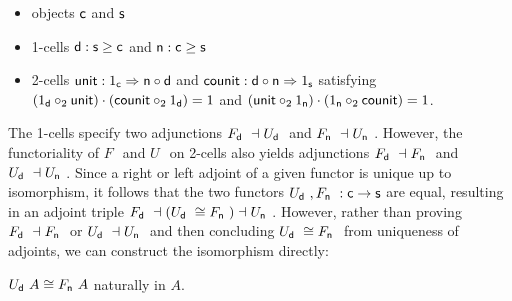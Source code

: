 \documentclass{drl-common/llncs}
\newcommand{\la}{\ensuremath{\dashv}}
\newcommand{\tc}[2]{\ensuremath{#1 \Rightarrow #2}}
\newcommand\compo[2]{\ensuremath{#1 \circ #2}}
\newcommand\compv[2]{\ensuremath{#1 \cdot #2}}
\newcommand\comph[2]{\ensuremath{#1 \mathbin{\circ_2} #2}}
\newcommand\F[2]{\ensuremath{F_{#1} \,\, #2}}
\newcommand\U[2]{\ensuremath{U_{#1} \,\, #2}}
\newcommand\iso{\cong}
\begin{document}
\begin{itemize}
\item objects $\mathsf{c}$ and $\mathsf{s}$
\item 1-cells $\mathsf{d} : \mathsf{s} \ge \mathsf{c}$ and $\mathsf{n} : \mathsf{c} \ge
  \mathsf{s}$
\item 2-cells $\dsd{unit} : \tc {1_{\dsd c}} {\compo{\dsd{n}} {\dsd{d}}}$ 
and $\dsd{counit} : \tc {\compo{\dsd{d}} {\dsd{n}}} {1_{\dsd s}}$ satisfying \\
$\compv{(\comph{1_{\dsd{d}}}{\dsd{unit}})}{(\comph{\dsd{counit}}{1_{\dsd d}})} = 1$
and 
$\compv{(\comph{\dsd{unit}}{1_{\dsd{n}}})}{(\comph{1_{\dsd n}}{\dsd{counit}})} = 1$.
\end{itemize}
\noindent
The 1-cells specify two adjunctions $\F{\dsd d}{} \la \U{\dsd d}{}$ and
$\F{\dsd n}{} \la \U{\dsd n}{}$.  However, the functoriality of $\F{}{}$
and $\U{}{}$ on 2-cells also yields adjunctions $\F{\dsd d}{} \la
\F{\dsd n}{}$ and $\U{\dsd d}{} \la \U{\dsd n}{}$.  Since a right or
left adjoint of a given functor is unique up to isomorphism, it follows
that the two functors $\U{\dsd d}{},\F{\dsd n}{} : \dsd c \to \dsd s$
are equal, resulting in an adjoint triple $\F{\dsd d}{} \la (\U{\dsd
  d}{} \iso \F{\dsd{n}}{}) \la \U{\dsd{n}}{}$.  However, rather than
proving $\F{\dsd d}{} \la \F{\dsd n}{}$ or $\U{\dsd d}{} \la \U{\dsd
  n}{}$ and then concluding $\U{\dsd d}{} \iso \F{\dsd n}{}$ from
uniqueness of adjoints, we can construct the isomorphism directly:

\begin{lemma} \label{lem:mergeFU}
$\U{\dsd d}{A} \iso \F{\dsd n}{A}$ naturally in $A$.
\end{lemma}
\end{document}
